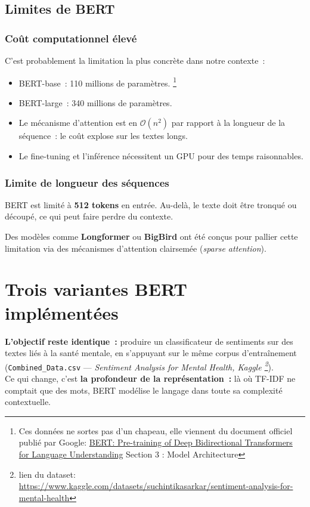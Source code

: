 \documentclass[12pt,a4paper]{report}
\begin{document}
\subsection{Limites de BERT}

\subsubsection{Coût computationnel élevé}

C'est probablement la limitation la plus concrète dans notre contexte~:

\begin{itemize}[leftmargin=1.5cm]
  \item BERT-base~: 110 millions de paramètres. \footnote[1]{Ces données ne sortes pas d'un chapeau, elle viennent du document officiel publié par Google: \href{https://arxiv.org/abs/1810.04805}{BERT: Pre-training of Deep Bidirectional Transformers for Language Understanding} Section 3 : Model Architecture}
  \item BERT-large~: 340 millions de paramètres.
  \item Le mécanisme d'attention est en $\mathcal{O}(n^2)$ par rapport à la longueur
    de la séquence~: le coût explose sur les textes longs.
  \item Le fine-tuning et l'inférence nécessitent un GPU pour des temps raisonnables.
\end{itemize}

\subsubsection{Limite de longueur des séquences}

BERT est limité à \textbf{512 tokens} en entrée. Au-delà, le texte doit être tronqué ou
découpé, ce qui peut faire perdre du contexte.

\begin{tip}
Des modèles comme \textbf{Longformer} ou \textbf{BigBird} ont été conçus pour pallier
cette limitation via des mécanismes d'attention clairsemée (\textit{sparse attention}).
\end{tip}

\vfill
\pagebreak

\section{Trois variantes BERT implémentées}

\textbf{L'objectif reste identique~:} produire un classificateur de sentiments sur des textes liés à la
santé mentale, en s'appuyant sur le même corpus d'entraînement
(\texttt{Combined\_Data.csv} — \textit{Sentiment Analysis for Mental Health, Kaggle \footnote{lien du dataset: \href{https://www.kaggle.com/datasets/suchintikasarkar/sentiment-analysis-for-mental-health}{https://www.kaggle.com/datasets/suchintikasarkar/sentiment-analysis-for-mental-health}}}).\\
Ce qui change, c'est \textbf{la profondeur de la représentation~:} là où TF-IDF ne comptait que des
mots, BERT modélise le langage dans toute sa complexité contextuelle.
\end{document}
